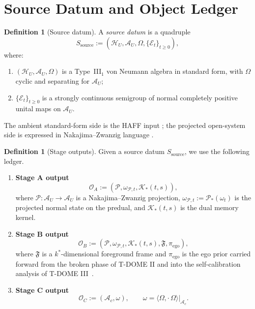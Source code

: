 \documentclass[12pt]{article}
\theoremstyle{definition}
\newtheorem{definition}[theorem]{Definition}
\theoremstyle{remark}
\begin{document}
\section{Source Datum and Object Ledger}\label{sec:ledger}

\begin{definition}[Source datum]
A \emph{source datum} is a quadruple
\[
S_{\mathrm{source}}
:=
(\mathcal H_U,\mathcal A_U,\Omega,\{\mathcal E_t\}_{t\ge 0}),
\]
where:
\begin{enumerate}
\item \((\mathcal H_U,\mathcal A_U,\Omega)\) is a Type~III\(_1\) von
  Neumann algebra in standard form, with \(\Omega\) cyclic and
  separating for \(\mathcal A_U\);
\item \(\{\mathcal E_t\}_{t\ge 0}\) is a strongly continuous semigroup
  of normal completely positive unital maps on \(\mathcal A_U\).
\end{enumerate}
\end{definition}

The ambient standard-form side is the HAFF input
\cite{HAFFD}; the projected open-system side is expressed in
Nakajima--Zwanzig language \cite{Nakajima1958,Zwanzig1960,
BreuerPetruccione2002}.

\begin{definition}[Stage outputs]
Given a source datum \(S_{\mathrm{source}}\), we use the following
ledger.
\begin{enumerate}
\item \textbf{Stage A output}
  \[
  \mathcal O_A
  :=
  (\mathcal P,\omega_{\mathcal P,t},\mathcal K_*(t,s)),
  \]
  where \(\mathcal P:\mathcal A_U\to\mathcal A_U\) is a
  Nakajima--Zwanzig projection,
  \(\omega_{\mathcal P,t}:=\mathcal P_*(\omega_t)\) is the projected
  normal state on the predual, and \(\mathcal K_*(t,s)\) is the dual
  memory kernel.
\item \textbf{Stage B output}
  \[
  \mathcal O_B
  :=
  (\mathcal P,\omega_{\mathcal P,t},\mathcal K_*(t,s),\mathfrak F,\pi_{\mathrm{ego}}),
  \]
  where \(\mathfrak F\) is a \(k^*\)-dimensional foreground frame and
  \(\pi_{\mathrm{ego}}\) is the ego prior carried forward from the
  broken phase of T-DOME II and into the self-calibration analysis of
  T-DOME III~\cite{TDOMEII,TDOMEIII}.
\item \textbf{Stage C output}
  \[
  \mathcal O_C
  :=
  (\mathcal A_c,\omega),
  \qquad
  \omega=\langle\Omega,\cdot\,\Omega\rangle|_{\mathcal A_c}.
  \]
\end{enumerate}
\end{definition}
\end{document}
